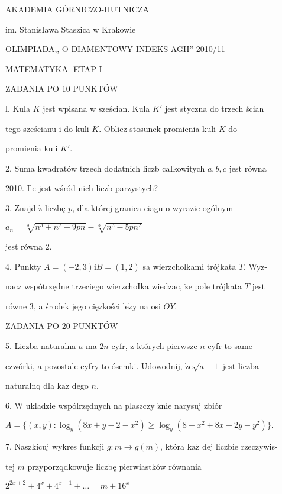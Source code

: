 \documentclass[a4paper,12pt]{article}
\begin{document}
AKADEMIA GÓRNICZO-HUTNICZA

im. StanisIawa Staszica w Krakowie

OLIMPIADA,, O DIAMENTOWY INDEKS AGH'' 2010/11

MATEMATYKA- ETAP I

ZADANIA PO 10 PUNKTÓW

l. Kula $K$ jest wpisana w sześcian. Kula $K'$ jest styczna do trzech ścian

tego sześcianu i do kuli $K$. Oblicz stosunek promienia kuli $K$ do

promienia kuli $K'.$

2. Suma kwadratów trzech dodatnich liczb caIkowitych $a, b, c$ jest równa

2010. Ile jest wśród nich liczb parzystych?

3. Znajd $\acute{\mathrm{z}}$ liczbę $p$, dla której granica ciagu o wyrazie ogólnym

$a_{n}=\sqrt[3]{n^{3}+n^{2}+9pn}-\sqrt[3]{n^{3}-5pn^{2}}$

jest równa 2.

4. Punkty $A= (-2,3) \mathrm{i}B= (1,2)$ sa wierzcholkami trójkata $T$. Wyz-

nacz wspótrzędne trzeciego wierzchoIka wiedzac, $\dot{\mathrm{z}}\mathrm{e}$ pole trójkata $T$ jest

równe 3, a środek jego cięzkości $\mathrm{l}\mathrm{e}\dot{\mathrm{z}}\mathrm{y}$ na osi $OY.$

ZADANIA PO 20 PUNKTÓW

5. Liczba naturalna $a$ ma $2n$ cyfr, z których pierwsze $n$ cyfr to same

czwórki, a pozostale cyfry to ósemki. Udowodnij, $\dot{\mathrm{z}}\mathrm{e}\sqrt{a+1}$ jest liczba

naturalnq dla $\mathrm{k}\mathrm{a}\dot{\mathrm{z}}$ dego $n.$

6. $\mathrm{W}$ ukladzie wspólrzędnych na plaszczy $\acute{\mathrm{z}}\mathrm{n}\mathrm{i}\mathrm{e}$ narysuj zbiór

$A=\{(x,y):\log_{y}(8x+y-2-x^{2})\geq\log_{y}(8-x^{2}+8x-2y-y^{2})\}.$

7. Naszkicuj wykres funkcji $g:m\rightarrow g(m)$, która $\mathrm{k}\mathrm{a}\dot{\mathrm{z}}$ dej liczbie rzeczywis-

tej $m$ przyporzqdkowuje liczbę pierwiastków równania

$2^{2x+2}+4^{x}+4^{x-1}+\ldots=m+16^{x}$
\end{document}
